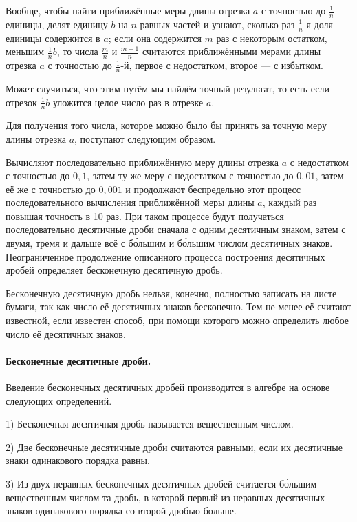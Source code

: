 \documentclass[twoside]{book}
\begin{document}
Вообще, чтобы найти приближённые меры длины отрезка $a$ с точностью до $\tfrac1n$ единицы, делят единицу $b$ на $n$ равных частей и узнают, сколько раз $\tfrac1n$-я доля единицы содержится в $a$;
если она содержится $m$ раз с некоторым остатком, меньшим $\tfrac1n b$, то числа $\tfrac mn$ и $\tfrac {m+1}n$ считаются приближёнными мерами длины отрезка $a$ с точностью до $\tfrac1n$-й, первое с недостатком, второе — с избытком.

Может случиться, что этим путём мы найдём точный результат, то есть если отрезок $\tfrac1n b$ уложится целое число раз в отрезке $a$.

Для получения того числа, которое можно было бы принять за точную меру длины отрезка $a$, поступают следующим образом.

Вычисляют последовательно приближённую меру длины отрезка $a$ с недостатком с точностью до $0{,}1$, затем ту же меру с недостатком с точностью до $0{,}01$, затем её же с точностью до $0{,}001$ и продолжают беспредельно этот процесс последовательного вычисления приближённой меры длины $a$, каждый раз повышая точность в 10 раз.
При таком процессе будут получаться последовательно десятичные дроби сначала с одним десятичным знаком, затем с двумя, тремя и дальше всё с б\'{о}льшим и б\'{о}льшим числом десятичных знаков.
Неограниченное продолжение описанного процесса построения десятичных дробей определяет бесконечную десятичную дробь.

Бесконечную десятичную дробь нельзя, конечно, полностью записать на листе бумаги, так как число её десятичных знаков бесконечно.
Тем не менее её считают известной, если известен способ, при помощи которого можно определить любое число её десятичных знаков.


\paragraph{Бесконечные десятичные дроби.}\label{1938/151}
Введение бесконечных десятичных дробей производится в алгебре на основе следующих определений.

1) Бесконечная десятичная дробь называется вещественным числом.

2) Две бесконечные десятичные дроби считаются равными, если их десятичные знаки одинакового порядка равны.

3) Из двух неравных бесконечных десятичных дробей считается б\'{о}льшим вещественным числом та дробь, в которой первый из неравных десятичных знаков одинакового порядка со второй дробью больше.
\end{document}
